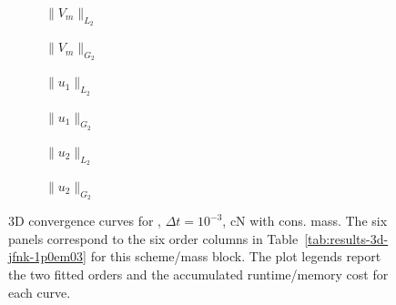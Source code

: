\begin{figure}[p]
\centering
\begin{subfigure}{0.485\linewidth}
\centering
{}
\caption{$\|V_m\|_{L_2}$}
\label{fig:results-3d-jfnk-1p0em03-cranknicolson-consistent-a}
\end{subfigure}
\hfill
\begin{subfigure}{0.485\linewidth}
\centering
{}
\caption{$\|V_m\|_{G_2}$}
\label{fig:results-3d-jfnk-1p0em03-cranknicolson-consistent-b}
\end{subfigure}
\par\vspace{0.8em}
\begin{subfigure}{0.485\linewidth}
\centering
{}
\caption{$\|u_1\|_{L_2}$}
\label{fig:results-3d-jfnk-1p0em03-cranknicolson-consistent-c}
\end{subfigure}
\hfill
\begin{subfigure}{0.485\linewidth}
\centering
{}
\caption{$\|u_1\|_{G_2}$}
\label{fig:results-3d-jfnk-1p0em03-cranknicolson-consistent-d}
\end{subfigure}
\par\vspace{0.8em}
\begin{subfigure}{0.485\linewidth}
\centering
{}
\caption{$\|u_2\|_{L_2}$}
\label{fig:results-3d-jfnk-1p0em03-cranknicolson-consistent-e}
\end{subfigure}
\hfill
\begin{subfigure}{0.485\linewidth}
\centering
{}
\caption{$\|u_2\|_{G_2}$}
\label{fig:results-3d-jfnk-1p0em03-cranknicolson-consistent-f}
\end{subfigure}
\caption{3D convergence curves for , $\Delta t=10^{-3}$, cN with cons. mass. The six panels correspond to the six order columns in Table~\ref{tab:results-3d-jfnk-1p0em03} for this scheme/mass block. The plot legends report the two fitted orders and the accumulated runtime/memory cost for each curve.}
\label{fig:results-3d-jfnk-1p0em03-cranknicolson-consistent}
\end{figure}
\FloatBarrier

